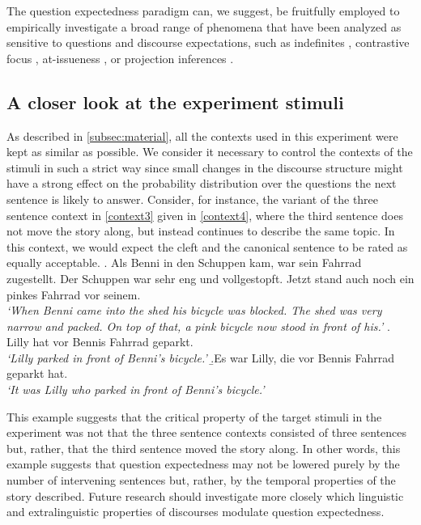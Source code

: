 \documentclass{salt}
\begin{document}
The question expectedness paradigm can, we suggest, be fruitfully employed to empirically investigate a broad range of phenomena that have been analyzed as sensitive to questions and discourse expectations, such as indefinites \cite[e.g.,][]{onea_2016}, contrastive focus \cite[e.g.,][]{zimmermann_2011b}, at-issueness \cite[e.g.,][]{destruel_velleman_2014}, or projection inferences \cite[e.g.,][]{tbd-variability}.



\subsection{A closer look at the experiment stimuli}

As described in \autoref{subsec:material}, all the contexts used in this experiment were kept as similar as possible. We consider it necessary to control the contexts of the stimuli in such a strict way since small changes in the discourse structure might have a strong effect on the probability distribution over the questions the next sentence is likely to answer. Consider, for instance, the variant of the three sentence context in \ref{context3} given in \ref{context4}, where the third sentence does not move the story along, but instead continues to describe the same topic. In this context, we would expect the cleft and the canonical sentence to be rated as equally acceptable.
 \ex. Als Benni in den Schuppen kam, war sein Fahrrad zugestellt. Der Schuppen war sehr eng und vollgestopft. Jetzt stand auch noch ein pinkes Fahrrad vor seinem.\\
 \textit{`When Benni came into the shed his bicycle was blocked. The shed was very narrow and packed. On top of that, a pink bicycle now stood in front of his.'}\label{context4} 
 \a.\label{canonical4} Lilly hat vor Bennis Fahrrad geparkt.\\
\textit{`Lilly parked in front of Benni's bicycle.'}
\b.\label{cleft4}Es war Lilly, die vor Bennis Fahrrad geparkt hat.\\
\textit{`It was Lilly who parked in front of Benni's bicycle.'}

This example suggests that the critical property of the target stimuli in the experiment was not that the three sentence contexts consisted of three sentences but, rather, that the third sentence moved the story along. In other words, this example suggests that question expectedness may not be lowered purely by the number of intervening sentences but, rather, by the temporal properties of the story described. Future research should investigate more closely which linguistic and extralinguistic properties of discourses modulate question expectedness.
\end{document}
